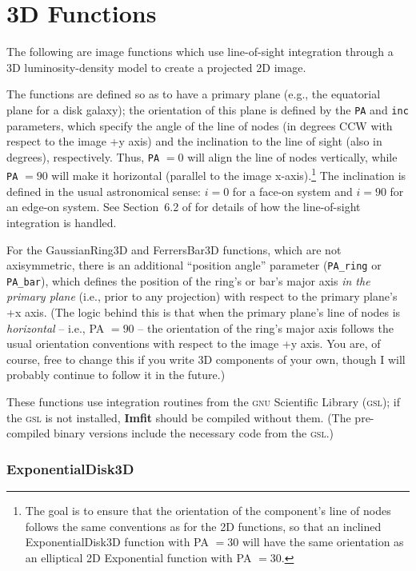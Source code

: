\documentclass[10pt,a4paper,article]{memoir}
\newcommand{\imfit}{\textbf{Imfit}}
\begin{document}
\section{3D Functions}

The following are image functions which use line-of-sight
integration through a 3D luminosity-density model to create a projected 2D
image.

The functions are defined so as to have a primary plane (e.g., the
equatorial plane for a disk galaxy); the orientation of this plane is
defined by the \texttt{PA} and \texttt{inc} parameters, which specify
the angle of the line of nodes (in degrees CCW with respect to the image
+y axis) and the inclination to the line of sight (also in degrees),
respectively. Thus, \texttt{PA} $= 0$ will align the line of nodes
vertically, while \texttt{PA} $= 90$ will make it horizontal (parallel
to the image x-axis).\footnote{The goal is to ensure that the
orientation of the component's line of nodes follows the same
conventions as for the 2D functions, so that an inclined
ExponentialDisk3D function with PA $= 30$ will have the same orientation
as an elliptical 2D Exponential function with PA $= 30$.} The
inclination is defined in the usual astronomical sense: $i = 0$ for a
face-on system and $i = 90$ for an edge-on system. See Section~6.2 of
\citet{erwin15} for details of how the line-of-sight integration is
handled.

For the GaussianRing3D and FerrersBar3D functions, which are not
axisymmetric, there is an additional ``position angle'' parameter
(\texttt{PA\_ring} or \texttt{PA\_bar}), which defines the position of
the ring's or bar's major axis \textit{in the primary plane} (i.e., prior to any
projection) with respect to the primary plane's +x axis. (The logic
behind this is that when the primary plane's line of nodes is
\textit{horizontal} -- i.e., PA $= 90$ -- the orientation of the
ring's major axis follows the usual orientation conventions with respect
to the image +y axis. You are, of course, free to change this if you
write 3D components of your own, though I will probably continue to
follow it in the future.)

These functions use integration routines from the \textsc{gnu}
Scientific Library (\textsc{gsl}); if the \textsc{gsl} is not installed,
\imfit{} should be compiled without them. (The pre-compiled binary
versions include the necessary code from the \textsc{gsl}.)


\subsubsection{ExponentialDisk3D}
\end{document}
